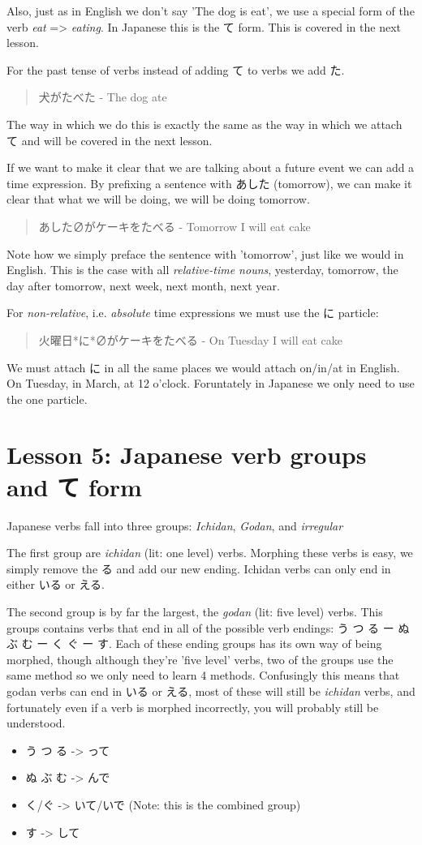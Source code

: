 \documentclass[11pt]{article}
\begin{document}
Also, just as in English we don't say 'The dog is eat', we use a special form of the verb \emph{eat} => \emph{eating}. In Japanese this is the て form. This is covered in the next lesson.

For the past tense of verbs instead of adding て to verbs we add た.
\begin{quote}
犬がたべた - The dog ate
\end{quote}
The way in which we do this is exactly the same as the way in which we attach て and will be covered in the next lesson.

If we want to make it clear that we are talking about a future event we can add a time expression. By prefixing a sentence with あした (tomorrow), we can make it clear that what we will be doing, we will be doing tomorrow.
\begin{quote}
あした∅がケーキをたべる - Tomorrow I will eat cake
\end{quote}
Note how we simply preface the sentence with 'tomorrow', just like we would in English. This is the case with all \emph{relative-time nouns}, yesterday, tomorrow, the day after tomorrow, next week, next month, next year.

For \emph{non-relative}, i.e. \emph{absolute} time expressions we must use the に particle:
\begin{quote}
火曜日*に*∅がケーキをたべる - On Tuesday I will eat cake
\end{quote}
We must attach に in all the same places we would attach on/in/at in English. On Tuesday, in March, at 12 o'clock. Foruntately in Japanese we only need to use the one particle.

\section{Lesson 5: Japanese verb groups and て form}
\label{sec:orge220df8}
Japanese verbs fall into three groups: \emph{Ichidan}, \emph{Godan}, and \emph{irregular}

The first group are \emph{ichidan} (lit: one level) verbs. Morphing these verbs is easy, we simply remove the る and add our new ending. Ichidan verbs can only end in either いる or える.

The second group is by far the largest, the \emph{godan} (lit: five level) verbs. This groups contains verbs that end in all of the possible verb endings: う つ る ー ぬ ぶ む ー く ぐ ー す. Each of these ending groups has its own way of being morphed, though although they're 'five level' verbs, two of the groups use the same method so we only need to learn 4 methods. Confusingly this means that godan verbs can end in いる or える, most of these will still be \emph{ichidan} verbs, and fortunately even if a verb is morphed incorrectly, you will probably still be understood.
\begin{itemize}
\item う つ る -> って
\item ぬ ぶ む -> んで
\item く/ぐ -> いて/いで (Note: this is the combined group)
\item す -> して
\end{itemize}
\end{document}
